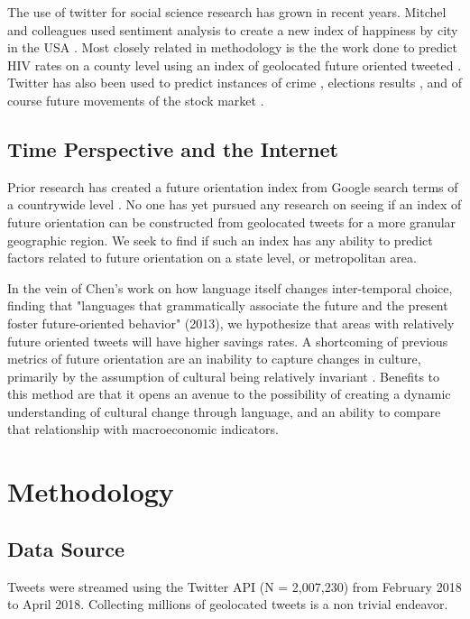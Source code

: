 \documentclass{article}
\begin{document}
The use of twitter for social science research has grown in recent years. Mitchel and colleagues used sentiment analysis to create a new index of happiness by city in the USA \cite{mitchell2013geography}. Most closely related in methodology is the the work done to predict HIV rates on a county level using an index of geolocated future oriented tweeted \cite{ireland2015future}. Twitter has also been used to predict instances of crime \cite{gerber2014predicting}, elections results \cite{tumasjan2011election}, and of course future movements of the stock market \cite{bollen2011twitter}. 


\subsection{Time Perspective and the Internet}

Prior research has created a future orientation index from Google search terms of a countrywide level \cite{preis2012quantifying}.
No one has yet pursued any research on seeing if an index of future orientation can be constructed from geolocated tweets for a more granular geographic region. We seek to find if such an index has any ability to predict factors related to future orientation on a state level, or metropolitan area.

In the vein of Chen's work on how language itself changes inter-temporal choice, finding that "languages that grammatically associate the future and the present foster future-oriented behavior" (2013), we hypothesize that areas with relatively future oriented tweets will have higher savings rates.
A shortcoming of previous metrics of future orientation are an inability to capture changes in culture, primarily by the assumption of cultural being relatively invariant \cite{tang2008framework}. Benefits to this method are that it opens an avenue to the possibility of creating a dynamic understanding of cultural change through language, and an ability to compare that relationship with macroeconomic indicators. 

\section{Methodology}

\subsection{Data Source}
Tweets were streamed using the Twitter API (N = 2,007,230) from February 2018 to April 2018. Collecting millions of geolocated tweets is a non trivial endeavor. 
\end{document}
